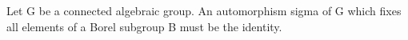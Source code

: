 Let G be a connected algebraic group. An automorphism sigma of G which fixes all elements of a Borel subgroup B must be the identity.
